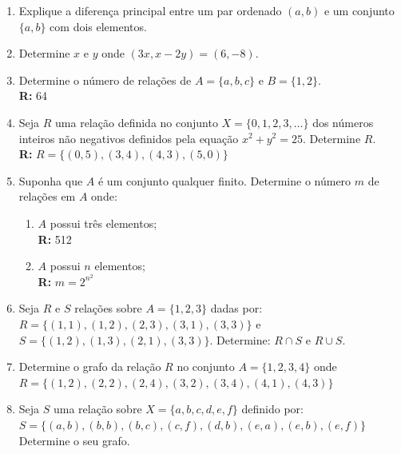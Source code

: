 \documentclass[oneside,a4paper,12pt]{article}
\begin{document}
\begin{enumerate}



	\item Explique a diferença principal entre um par ordenado $(a,b)$ e um conjunto $\{a,b\}$ com dois elementos.

	\item Determine $x$ e $y$ onde $(3x,x-2y) = (6,-8)$.
	
	\item Determine o número de relações de $A = \{a,b,c\}$ e $B = \{1,2\}$. \\{\bf R:} 64

	\item Seja $R$ uma relação definida no conjunto $X = \{0,1,2,3,\dots\}$ dos números inteiros não negativos definidos pela equação $x^2 + y^2 = 25$. Determine $R$.
	\\{\bf R: }$R = \{(0,5), (3,4), (4,3), (5,0)\}$

	\item Suponha que $A$ é um conjunto qualquer finito. Determine o número $m$ de relações em $A$ onde:
	\begin{enumerate}
		\item $A$ possui três elementos; \\ {\bf R:} 512
		\item $A$ possui $n$ elementos; \\ {\bf R:} $m = 2^{n^2}$
	\end{enumerate}

	\item Seja $R$ e $S$ relações sobre $A = \{1,2,3\}$ dadas por: $R = \{(1,1), (1,2), (2,3), (3,1), (3,3)\}$ e $S = \{(1,2), (1,3), (2,1), (3,3)\}$. Determine: $R \cap S$ e $R \cup S$.
	
	\item Determine o grafo da relação $R$ no conjunto $A = \{1,2,3,4\}$ onde \\ $R = \{ (1,2), (2,2), (2,4), (3,2), (3,4), (4,1), (4,3)\}$

	\item Seja $S$ uma relação sobre $X = \{ a,b,c,d,e,f \}$ definido por: \\ $S = \{ (a,b), (b,b), (b,c), (c,f), (d,b), (e,a), (e,b), (e,f) \}$ \\ Determine o seu grafo.


\end{enumerate}
\end{document}
